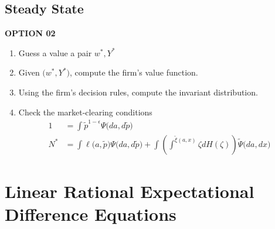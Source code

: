 \documentclass[a4paper,10pt]{article}  %
\begin{document}

\subsection{Steady State} %
\label{sub:steady_state}

\textbf{OPTION 02}

\begin{enumerate}
   
   \item Guess a value a pair $ w^*,Y^* $
   \item Given $ \Big(w^*,Y^* \Big) $, compute the firm's value function.
   \item Using the firm's decision rules, compute the invariant distribution.
   \item Check the market-clearing conditions
      \begin{align*}
         1 & = \int \tilde{p}^{1-\epsilon} \Psi\big(da, d\tilde{p} \big) \\
         N^* & = 
         \int \ell \big( a, \tilde{p} \big) \Psi \big(da,d\tilde{p} \big) + 
         \int \left( \int^{\tilde{\xi}( a, x) } \zeta dH( \zeta) \right) \widetilde{\Psi} \big( da,dx \big)
      \end{align*}
\end{enumerate}




\newpage
\section{Linear Rational Expectational Difference Equations} %
\label{sec:linear_rational_expectational_difference_equations}
\end{document}
